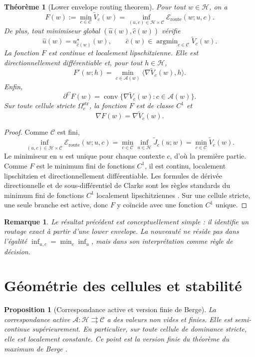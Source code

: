 \documentclass[11pt,a4paper]{article}
\newtheorem{proposition}{Proposition}[section]
\newtheorem{theorem}{Théorème}[section]
\newtheorem{remark}{Remarque}[section]
\DeclareMathOperator{\argmin}{argmin}
\DeclareMathOperator{\conv}{conv}
\newcommand{\Hh}{\mathcal H}
\newcommand{\Ccal}{\mathcal C}
\newcommand{\Acal}{\mathcal A}
\begin{document}
\begin{theorem}[Lower envelope routing theorem]
Pour tout \(w\in\Hh\), on a
\[
F(w):=\min_{c\in\Ccal}\widetilde V_c(w)
=
\inf_{(u,c)\in\Hh\times\Ccal}\mathcal E_{\mathrm{route}}(w;u,c).
\]
De plus, tout minimiseur global \((\hat u(w),\hat c(w))\) vérifie
\[
\hat u(w)=u_{\hat c(w)}^\star(w),
\qquad
\hat c(w)\in\argmin_{c\in\Ccal}\widetilde V_c(w).
\]
La fonction \(F\) est continue et localement lipschitzienne. Elle est directionnellement différentiable et, pour tout \(h\in\Hh\),
\[
F'(w;h)=\min_{c\in\Acal(w)}\langle \nabla \widetilde V_c(w),h\rangle.
\]
Enfin,
\[
\partial^C F(w)=\conv\{\nabla \widetilde V_c(w): c\in\Acal(w)\}.
\]
Sur toute cellule stricte \(\Omega_c^{\mathrm{str}}\), la fonction \(F\) est de classe \(C^1\) et
\[
\nabla F(w)=\nabla \widetilde V_c(w).
\]
\end{theorem}

\begin{proof}
Comme \(\Ccal\) est fini,
\[
\inf_{(u,c)\in\Hh\times\Ccal}\mathcal E_{\mathrm{route}}(w;u,c)
=
\min_{c\in\Ccal}\inf_{u\in\Hh}\widetilde J_c(u;w)
=
\min_{c\in\Ccal}\widetilde V_c(w).
\]
Le minimiseur en \(u\) est unique pour chaque contexte \(c\), d'où la première partie. Comme \(F\) est le minimum fini de fonctions \(C^1\), il est continu, localement lipschitzien et directionnellement différentiable. Les formules de dérivée directionnelle et de sous-différentiel de Clarke sont les règles standards du minimum fini de fonctions \(C^1\) localement lipschitziennes \cite{Clarke1983}. Sur une cellule stricte, une seule branche est active, donc \(F\) y coïncide avec une fonction \(C^1\) unique.
\end{proof}

\begin{remark}
Le résultat précédent est conceptuellement simple : il identifie un routage exact à partir d'une lower envelope. La nouveauté ne réside pas dans l'égalité \(\inf_{u,c}=\min_c\inf_u\), mais dans son interprétation comme règle de décision.
\end{remark}

\section{Géométrie des cellules et stabilité}

\begin{proposition}[Correspondance active et version finie de Berge]
La correspondance active \(\Acal:\Hh\rightrightarrows\Ccal\) a des valeurs non vides et finies. Elle est semi-continue supérieurement. En particulier, sur toute cellule de dominance stricte, elle est localement constante. Ce point est la version finie du théorème du maximum de Berge \cite{Berge1963}.
\end{proposition}
\end{document}
